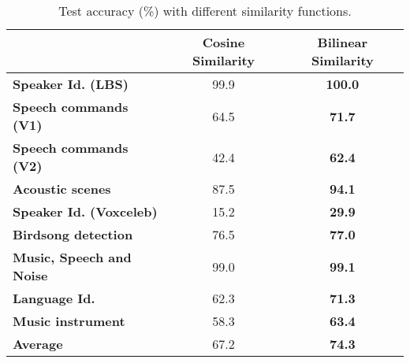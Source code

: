 \documentclass{article}
\begin{document}
\begin{table}[!htbp]
\centering
\caption{Test accuracy (\%) with different similarity functions.}
\vspace{0.1cm}

\footnotesize
\label{tab:ablation_similarity}
\begin{tabular}{@{}lcc@{}}
\toprule
& \textbf{Cosine  Similarity} & \textbf{Bilinear Similarity} \\ \midrule
\textbf{Speaker Id. (LBS)}       & 99.9                        & \textbf{100.0}                     \\
\textbf{Speech commands (V1)}    & 64.5                        & \textbf{71.7}                      \\
\textbf{Speech commands (V2)}    & 42.4                        & \textbf{62.4}                     \\
\textbf{Acoustic scenes}         & 87.5                        & \textbf{94.1}                      \\
\textbf{Speaker Id. (Voxceleb)}  & 15.2                        & \textbf{29.9}                      \\
\textbf{Birdsong detection}      & 76.5                        & \textbf{77.0}                      \\
\textbf{Music, Speech and Noise} & 99.0                        & \textbf{99.1}                      \\
\textbf{Language Id.}            & 62.3                        & \textbf{71.3}                      \\
\textbf{Music instrument}        & 58.3                        & \textbf{63.4}                      \\ \midrule
\textbf{Average}                 & 67.2                        & \textbf{74.3}                      \\ \bottomrule
\end{tabular}
\end{table}
\end{document}
